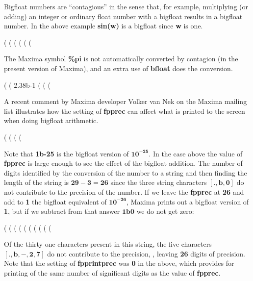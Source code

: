 \documentclass[12pt]{article}
\begin{document}
\noindent Bigfloat numbers are ``contagious'' in the sense that, for example, multiplying
  (or adding) an integer or ordinary float number with a bigfloat results in a bigfloat
  number.
In the above example \textbf{sin(w)} is a bigfloat since \textbf{w} is one. 
\begin{myVerbatim}
(%
(%
(%
(%
(%
(%
\end{myVerbatim} 
The Maxima symbol \textbf{\%pi} is not automatically converted by contagion (in
  the present version of Maxima), and an extra use of \textbf{bfloat} does the conversion. 
\begin{myVerbatim}
(%
(%
                                   2.38b-1 %
(%
(%
(%
\end{myVerbatim} 
A recent comment by Maxima developer Volker van Nek on the Maxima mailing list
  illustrates how the setting of \textbf{fpprec} can affect  what is printed
  to the screen when doing bigfloat arithmetic. 
\begin{myVerbatim}
(%
(%
(%
(%
\end{myVerbatim} 
Note that \textbf{1b-25} is the bigfloat version of $\mathbf{10^{-25}}$.
In the case above the value of \textbf{fpprec} is large enough to see the effect of
  the bigfloat addition.
The number of digits identified by the conversion of the number to a string and
  then finding the length of the string is $\mathbf{29 - 3 = 26}$ since the three 
  string characters $\mathbf{[., b, 0]}$ do not contribute
  to the precision of the number.  
\noindent If we leave the \textbf{fpprec} at \textbf{26} and add to \textbf{1}
  the bigfloat equivalent of $\mathbf{10^{-26}}$, Maxima prints out a bigfloat version of \textbf{1}, but
  if we subtract from that answer $\mathbf{1b0}$ we do not get zero: 
\begin{myVerbatim}
(%
(%
(%
(%
(%
(%
(%
(%
(%
(%
\end{myVerbatim} 
Of the thirty one characters present in this string, the five characters $\mathbf{[., b, -, 2, 7]}$
   do not contribute to the precision, , leaving \textbf{26} digits of precision.
Note that the setting of \textbf{fpprintprec} was \textbf{0} in the above, which provides for
  printing of the same number of significant digits as the value of \textbf{fpprec}.\\
  
\end{document}
